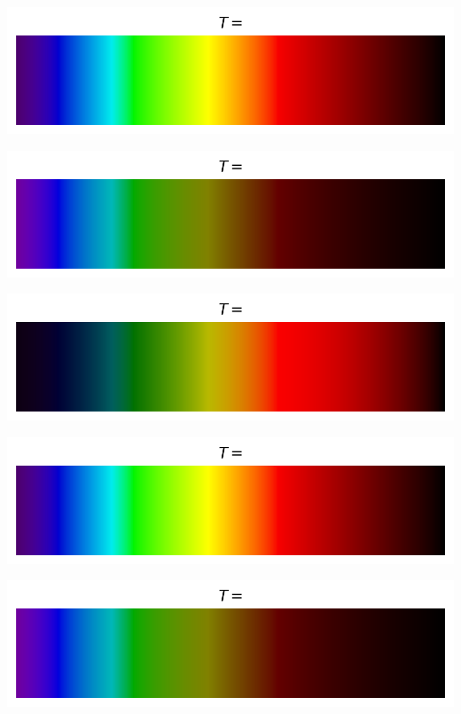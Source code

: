 \documentclass[12pt,a4paper,fleqn]{article}
\begin{document}
\begin{landscape}
\begin{center}
\begin{multicols}{3}
\includegraphics[width=\linewidth]{images/spectrum_black_body_temp5000K_notemp.png}

\includegraphics[width=\linewidth]{images/spectrum_black_body_temp10000K_notemp.png}
\end{multicols}
\end{center}

\begin{center}
\begin{multicols}{3}
\includegraphics[width=\linewidth]{images/spectrum_black_body_temp3000K_notemp.png}

\includegraphics[width=\linewidth]{images/spectrum_black_body_temp5000K_notemp.png}

\includegraphics[width=\linewidth]{images/spectrum_black_body_temp10000K_notemp.png}
\end{multicols}
\end{center}


\end{landscape}
\end{document}
